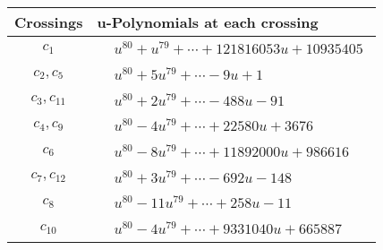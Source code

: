 \documentclass[1p]{elsarticle_modified}
\theoremstyle{definition}
\begin{document}
\begin{tabular}{m{50pt}|m{274pt}}
Crossings & \hspace{64pt}u-Polynomials at each crossing \\
\hline $$\begin{aligned}c_{1}\end{aligned}$$&$\begin{aligned}
&u^{80}+u^{79}+\cdots+121816053 u+10935405
\end{aligned}$\\
\hline $$\begin{aligned}c_{2},c_{5}\end{aligned}$$&$\begin{aligned}
&u^{80}+5 u^{79}+\cdots-9 u+1
\end{aligned}$\\
\hline $$\begin{aligned}c_{3},c_{11}\end{aligned}$$&$\begin{aligned}
&u^{80}+2 u^{79}+\cdots-488 u-91
\end{aligned}$\\
\hline $$\begin{aligned}c_{4},c_{9}\end{aligned}$$&$\begin{aligned}
&u^{80}-4 u^{79}+\cdots+22580 u+3676
\end{aligned}$\\
\hline $$\begin{aligned}c_{6}\end{aligned}$$&$\begin{aligned}
&u^{80}-8 u^{79}+\cdots+11892000 u+986616
\end{aligned}$\\
\hline $$\begin{aligned}c_{7},c_{12}\end{aligned}$$&$\begin{aligned}
&u^{80}+3 u^{79}+\cdots-692 u-148
\end{aligned}$\\
\hline $$\begin{aligned}c_{8}\end{aligned}$$&$\begin{aligned}
&u^{80}-11 u^{79}+\cdots+258 u-11
\end{aligned}$\\
\hline $$\begin{aligned}c_{10}\end{aligned}$$&$\begin{aligned}
&u^{80}-4 u^{79}+\cdots+9331040 u+665887
\end{aligned}$\\
\hline
\end{tabular}\\~\\
\end{document}
